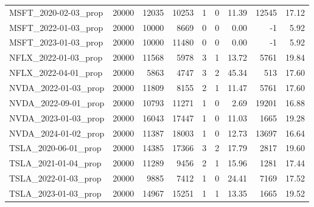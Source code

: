 \documentclass[10pt,a4paper,landscape]{article}
\begin{document}
\begin{longtable}{lrrrrrrrr}
MSFT\_2020-02-03\_prop & 20000 & 12035 & 10253 & 1 & 0 & 11.39 & 12545 & 17.12 \\
MSFT\_2022-01-03\_prop & 20000 & 10000 & 8669 & 0 & 0 & 0.00 & -1 & 5.92 \\
MSFT\_2023-01-03\_prop & 20000 & 10000 & 11480 & 0 & 0 & 0.00 & -1 & 5.92 \\
NFLX\_2022-01-03\_prop & 20000 & 11568 & 5978 & 3 & 1 & 13.72 & 5761 & 19.84 \\
NFLX\_2022-04-01\_prop & 20000 & 5863 & 4747 & 3 & 2 & 45.34 & 513 & 17.60 \\
NVDA\_2022-01-03\_prop & 20000 & 11809 & 8155 & 2 & 1 & 11.47 & 5761 & 17.60 \\
NVDA\_2022-09-01\_prop & 20000 & 10793 & 11271 & 1 & 0 & 2.69 & 19201 & 16.88 \\
NVDA\_2023-01-03\_prop & 20000 & 16043 & 17447 & 1 & 0 & 11.03 & 1665 & 19.28 \\
NVDA\_2024-01-02\_prop & 20000 & 11387 & 18003 & 1 & 0 & 12.73 & 13697 & 16.64 \\
TSLA\_2020-06-01\_prop & 20000 & 14385 & 17366 & 3 & 2 & 17.79 & 2817 & 19.60 \\
TSLA\_2021-01-04\_prop & 20000 & 11289 & 9456 & 2 & 1 & 15.96 & 1281 & 17.44 \\
TSLA\_2022-01-03\_prop & 20000 & 9885 & 7412 & 1 & 0 & 24.41 & 7169 & 17.52 \\
TSLA\_2023-01-03\_prop & 20000 & 14967 & 15251 & 1 & 1 & 13.35 & 1665 & 19.52 \\
\bottomrule\end{longtable}
\end{document}
